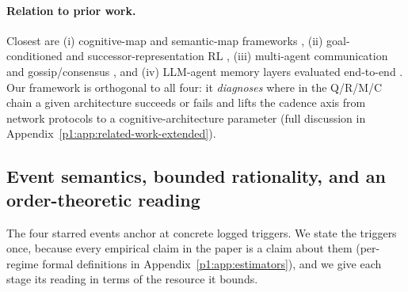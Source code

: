\documentclass{article}
\begin{document}
\paragraph{Relation to prior work.} Closest are (i) cognitive-map and semantic-map frameworks \citep{tolman1948cognitive,okeefe1978hippocampus,kuipers2000spatial,gupta2017cognitive,savinov2018semi}, (ii) goal-conditioned and successor-representation RL \citep{andrychowicz2017hindsight,ghosh2021learning,dayan1993improving,stachenfeld2017hippocampus,momennejad2017successor}, (iii) multi-agent communication \citep{lowe2017maddpg,foerster2018ctde,sukhbaatar2016commnet,foerster2016learning} and gossip/consensus \citep{boyd2006gossip,xiao2007distributed}, and (iv) LLM-agent memory layers evaluated end-to-end \citep{wang2023voyager,shinn2023reflexion,packer2023memgpt}. Our framework is orthogonal to all four: it \emph{diagnoses} where in the Q/R/M/C chain a given architecture succeeds or fails and lifts the cadence axis from network protocols to a cognitive-architecture parameter (full discussion in Appendix~\ref{p1:app:related-work-extended}).

\subsection{Event semantics, bounded rationality, and an order-theoretic reading}
\label{p1:sec:event-semantics}

The four starred events anchor at concrete logged triggers. We state the triggers once, because every empirical claim in the paper is a claim about them (per-regime formal definitions in Appendix~\ref{p1:app:estimators}), and we give each stage its reading in terms of the resource it bounds.
\end{document}
